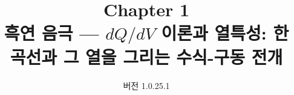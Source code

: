 
\renewcommand{\theequation}{1.\arabic{equation}}
\renewcommand{\thesection}{1.\arabic{section}}

\title{\textbf{\LARGE Chapter 1}\\[0.35em]\Large 흑연 음극 --- $dQ/dV$ 이론과 열특성: 한 곡선과 그 열을 그리는 수식-구동 전개}
\author{}
\date{\normalsize 버전 1.0.25.1}


\maketitle

































